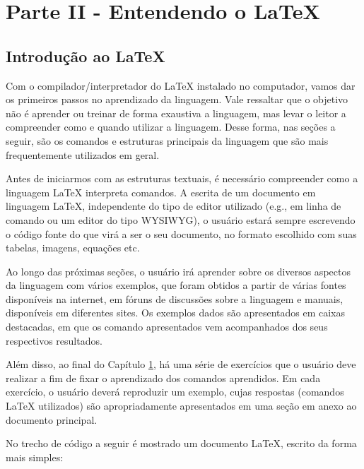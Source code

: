 \chapter{Parte II - Entendendo o \LaTeX{}}
\label{cap:parteII}

\section{Introdução ao \LaTeX{}}
\label{sec:intro_latex}

Com o compilador/interpretador do \LaTeX{} instalado no computador, vamos dar os primeiros passos no aprendizado da linguagem. Vale ressaltar que o objetivo não é aprender ou treinar de forma exaustiva a linguagem, mas levar o leitor a compreender como e quando utilizar a linguagem. Desse forma, nas seções a seguir, são os comandos e estruturas principais da linguagem que são mais frequentemente utilizados em geral.

Antes de iniciarmos com as estruturas textuais, é necessário compreender como a linguagem \LaTeX{} interpreta comandos. A escrita de um documento em linguagem \LaTeX{}, independente do tipo de editor utilizado (e.g., em linha de comando ou um editor do tipo WYSIWYG), o usuário estará sempre escrevendo o código fonte do que virá a ser o seu documento, no formato escolhido com suas tabelas, imagens, equações etc. 

Ao longo das próximas seções, o usuário irá aprender sobre os diversos aspectos da linguagem com vários exemplos, que foram obtidos a partir de várias fontes disponíveis na internet, em fóruns de discussões sobre a linguagem e manuais, disponíveis em diferentes sites. Os exemplos dados são apresentados em caixas destacadas, em que os comando apresentados vem acompanhados dos seus respectivos resultados.

Além disso, ao final do Capítulo \ref{cap:parteII}, há uma série de exercícios que o usuário deve realizar a fim de fixar o aprendizado dos comandos aprendidos. Em cada exercício, o usuário deverá reproduzir um exemplo, cujas respostas (comandos \LaTeX{} utilizados) são apropriadamente apresentados em uma seção em anexo ao documento principal.

No trecho de código a seguir é mostrado um documento \LaTeX{}, escrito da forma mais simples:

